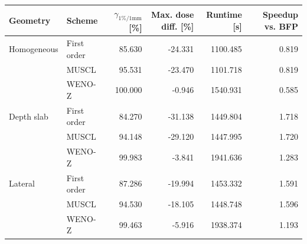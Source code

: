\begin{tabular}{llrrrr}
\toprule
Geometry & Scheme & $\gamma_{1\%/1\mathrm{mm}}$ [\%] & Max. dose diff. [\%] & Runtime [s] & Speedup vs. BFP \\
\midrule
Homogeneous & First order & 85.630 & -24.331 & 1100.485 & 0.819 \\
 & MUSCL & 95.531 & -23.470 & 1101.718 & 0.819 \\
 & WENO-Z & 100.000 & -0.946 & 1540.931 & 0.585 \\
\addlinespace
Depth slab & First order & 84.270 & -31.138 & 1449.804 & 1.718 \\
 & MUSCL & 94.148 & -29.120 & 1447.995 & 1.720 \\
 & WENO-Z & 99.983 & -3.841 & 1941.636 & 1.283 \\
\addlinespace
Lateral & First order & 87.286 & -19.994 & 1453.332 & 1.591 \\
 & MUSCL & 94.530 & -18.105 & 1448.748 & 1.596 \\
 & WENO-Z & 99.463 & -5.916 & 1938.374 & 1.193 \\
\bottomrule
\end{tabular}
